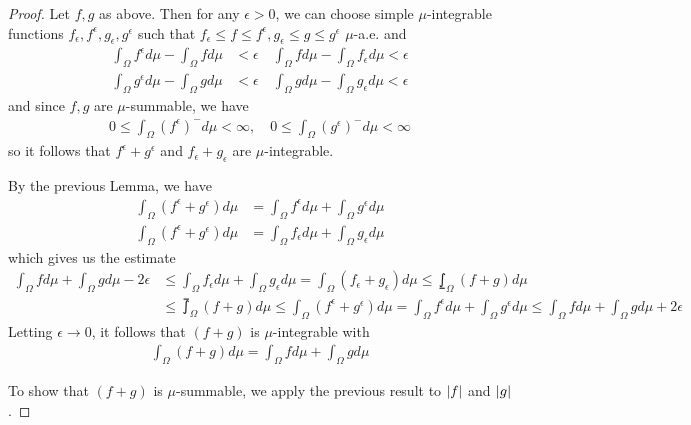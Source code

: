 \begin{proof}
  Let $f,g$ as above.
  Then for any $\epsilon > 0$, we can choose simple $\mu$-integrable functions $f_{\epsilon},f^{\epsilon},g_{\epsilon},g^{\epsilon}$ such that
  $f_{\epsilon} \leq f\leq f^{\epsilon}, g_{\epsilon} \leq g \leq g^{\epsilon}$ $\mu$-a.e.
  and
  \begin{align*}
    \int_{\Omega} f^{\epsilon} d \mu - \int_{\Omega} f d \mu &< \epsilon
    \quad
    \int_{\Omega} f d \mu - \int_{\Omega} f_{\epsilon} d \mu < \epsilon\\
    \int_{\Omega} g^{\epsilon} d \mu - \int_{\Omega} g d \mu &< \epsilon
    \quad
    \int_{\Omega} g d \mu - \int_{\Omega} g_{\epsilon} d \mu < \epsilon
  \end{align*}
  and since $f,g$ are $\mu$-summable, we have
  \begin{align*}
    0 \leq \int_{\Omega} (f^{\epsilon})^{-} d \mu < \infty, \quad
    0 \leq \int_{\Omega} (g^{\epsilon})^{-} d \mu < \infty
  \end{align*}
  so it follows that $f^{\epsilon}+g^{\epsilon}$ and $f_{\epsilon} + g_{\epsilon}$ are $\mu$-integrable.

  By the previous Lemma, we have
  \begin{align*}
    \int_{\Omega} (f^{\epsilon} + g^{\epsilon}) d \mu 
    &= 
    \int_{\Omega} f^{\epsilon} d \mu + \int_{\Omega} g^{\epsilon} d \mu\\
    \int_{\Omega} (f^{\epsilon} + g^{\epsilon}) d \mu 
    &= 
    \int_{\Omega} f_{\epsilon} d \mu + \int_{\Omega} g_{\epsilon} d \mu
  \end{align*}
  which gives us the estimate
  \begin{align*}
    \int_{\Omega} f d \mu + \int_{\Omega} g d \mu - 2 \epsilon 
    &\leq
    \int_{\Omega} f_{\epsilon} d \mu + \int_{\Omega} g_{\epsilon} d \mu
    =
    \int_{\Omega} (f_{\epsilon} + g_{\epsilon}) d \mu
    \leq 
    \lowint_{\Omega} (f + g) d \mu
    \\
    &\leq
    \upint_{\Omega} (f + g) d \mu
    \leq 
    \int_{\Omega} (f^{\epsilon} + g^{\epsilon}) d \mu
    =
    \int_{\Omega} f^{\epsilon} d \mu + \int_{\Omega} g^{\epsilon} d \mu
    \leq
    \int_{\Omega} f d \mu + \int_{\Omega} g d \mu + 2 \epsilon
  \end{align*}
  Letting $\epsilon \to 0$, it follows that $(f + g)$ is $\mu$-integrable with
  \begin{align*}
    \int_{\Omega} (f + g) d \mu = \int_{\Omega} f d \mu + \int_{\Omega} g d \mu
  \end{align*}

  To show that $(f+g)$ is $\mu$-summable, we apply the previous result to $\vert f\vert$ and $\vert g\vert$.

\end{proof}
